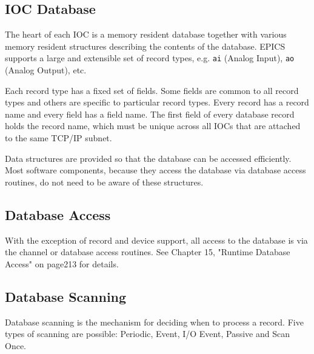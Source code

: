 \subsection{IOC Database}

The heart of each IOC is a memory resident database together with various memory resident structures describing the 
contents of the database. EPICS supports a large and extensible set of record types, e.g. \verb|ai| (Analog Input), \verb|ao| (Analog 
Output), etc.

Each record type has a fixed set of fields. Some fields are common to all record types and others are specific to particular 
record types. Every record has a record name and every field has a field name. The first field of every database record 
holds the record name, which must be unique across all IOCs that are attached to the same TCP/IP subnet.

Data structures are provided so that the database can be accessed efficiently. Most software components, because they 
access the database via database access routines, do not need to be aware of these structures.

\subsection{Database Access}

With the exception of record and device support, all access to the database is via the channel or database access routines. 
See Chapter 15, "Runtime Database Access" on page213 for details.

\subsection{Database Scanning}

Database scanning is the mechanism for deciding when to process a record. Five types of scanning are possible: Periodic, 
Event, I/O Event, Passive and Scan Once.

